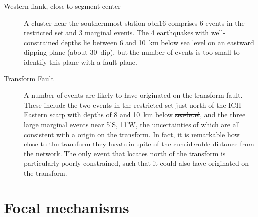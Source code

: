 \documentclass[jgrga]{agu2001} %
\newlength{\tw}
\providecommand{\DIFadd}[1]{{\protect\color{blue}\uwave{#1}}} %
\providecommand{\DIFdel}[1]{{\protect\color{red}\sout{#1}}}                      %
\providecommand{\DIFaddbegin}{} %
\providecommand{\DIFaddend}{} %
\providecommand{\DIFdelbegin}{} %
\providecommand{\DIFdelend}{} %
\begin{document}
\begin{article}
\begin{description}
\item[Western flank, close to segment center]
A cluster near the southernmost station obh16
comprises 6 events in the restricted set and 3 marginal events.
The 4 earthquakes with well-constrained depths lie between  6 and
10~km below sea level on an eastward
dipping plane (about 30\dg\ dip), but the number of events is too small to identify this
plane with a fault plane.

\item[Transform Fault]  A number of events are likely to have
originated on the transform fault.  These include the two events in the
restricted set just north of the ICH Eastern scarp with depths of
8 and 10~km below \DIFdelbegin \DIFdel{sea-level}\DIFdelend \DIFaddbegin \DIFadd{sea level}\DIFaddend , and the three
large marginal events near 5'S, 11'W, the uncertainties of
which are all consistent with a origin on the transform. In fact, it
is remarkable how close to the transform they locate in spite of  the
considerable distance from the network.  The only event that locates  north of the transform is
particularly poorly constrained, such that it could also have
originated on the transform.  

\end{description}

\section{Focal mechanisms}


\end{article}
\end{document}
